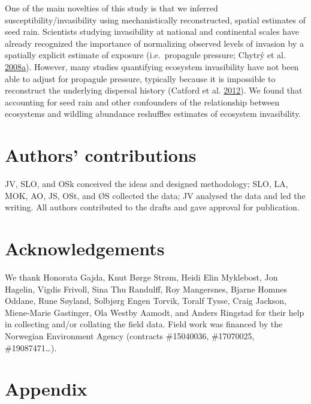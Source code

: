 \documentclass[
]{article}
\begin{document}
One of the main novelties of this study is that we inferred susceptibility/invasibility using mechanistically reconstructed, spatial estimates of seed rain.
Scientists studying invasibility at national and continental scales have already recognized the importance of normalizing observed levels of invasion by a spatially explicit estimate of exposure (i.e.~propagule pressure; Chytrý et al. \protect\hyperlink{ref-chytrySeparatingHabitatInvasibility2008}{2008}\protect\hyperlink{ref-chytrySeparatingHabitatInvasibility2008}{a}).
However, many studies quantifying ecosystem invasibility have not been able to adjust for propagule pressure, typically because it is impossible to reconstruct the underlying dispersal history (Catford et al. \protect\hyperlink{ref-catfordQuantifyingLevelsBiological2012}{2012}).
We found that accounting for seed rain and other confounders of the relationship between ecosystems and wildling abundance reshuffles estimates of ecosystem invasibility.

\hypertarget{authors-contributions}{%
\section{Authors' contributions}\label{authors-contributions}}

JV, SLO, and OSk conceived the ideas and designed methodology; SLO, LA, MOK, AO, JS, OSt, and ØS collected the data; JV analysed the data and led the writing. All authors contributed to the drafts and gave approval for publication.

\hypertarget{acknowledgements}{%
\section{Acknowledgements}\label{acknowledgements}}

We thank Honorata Gajda, Knut Børge Strøm, Heidi Elin Myklebost, Jon Hagelin, Vigdis Frivoll, Sina Thu Randulff, Roy Mangersnes, Bjarne Homnes Oddane, Rune Søyland, Solbjørg Engen Torvik, Toralf Tysse, Craig Jackson, Miene-Marie Gastinger, Ola Westby Aamodt, and Anders Ringstad for their help in collecting and/or collating the field data. Field work was financed by the Norwegian Environment Agency (contracts \#15040036, \#17070025, \#19087471\ldots).

\hypertarget{appendix}{%
\section{Appendix}\label{appendix}}
\end{document}
